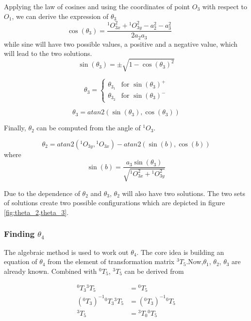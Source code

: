 \documentclass{article}
\renewcommand{\c}[1]{\cos(\theta_{#1})}
\newcommand{\s}[1]{\sin(\theta_{#1})}
\newcommand{\T}[2]{{}^{#1}T_{#2}}
\renewcommand{\O}[2]{{}^{#1}O_{#2}}
\begin{document}
Applying the law of cosines and using the coordinates of point $O_3$ with respect to $O_1$, we can derive the expression of $\theta_3$
\begin{equation*}
\c{3} = \frac{\O{1}{3x}^2 + \O{1}{3y}^2 - a_2^2 - a_3^2}{2a_2a_3}\qquad
\end{equation*}
while sine will have two possible values, a positive and a negative value, which will lead to the two solutions.
\begin{equation*}
\s{3} = \pm\sqrt{1-\c{3}^2}
\end{equation*}

\begin{equation*}
\theta_{3} = \begin{cases} 
   \theta_{3_1} & \text{for } {\s{3}}^+ \\
   \theta_{3_2} & \text{for } {\s{3}}^-
  \end{cases}
\end{equation*}

\begin{equation}
\theta_{3} = atan2(\s{3},\c{3})
\end{equation}

Finally, $\theta_2$ can be computed from the angle of $\O{1}{3}$.

\begin{equation}
\theta_{2} = atan2(\O{1}{3y},\O{1}{3x})-atan2(\sin(b),\cos(b) )
\end{equation}
where
\begin{equation*}
\sin(b)= \frac{a_3\s{3}}{\sqrt{\O{1}{3x}^2+\O{1}{3y}^2}}
\end{equation*}

Due to the dependence of $\theta_2$ and $\theta_3$,  $\theta_2$ will also have two solutions. The two sets of solutions create two possible configurations which are depicted in figure \ref{fig:theta_2,theta_3}.

\subsubsection{Finding $\theta_4$}
The algebraic method is used to work out $\theta_4$. The core idea is building an equation of $\theta_4$ from the element of transformation matrix $\T{3}{5}$.Now,$\theta_1$, $\theta_2$, $\theta_3$ are already known. Combined with  $\T{0}{5}$,  $\T{3}{5}$ can be derived from

\begin{align}
\label{eq:inverse.t_35}
\T{0}{3}\T{3}{5} & = \T{0}{5} \nonumber \\
{(\T{0}{3})}^{-1}\T{0}{3}\T{3}{5}& = {(\T{0}{3})}^{-1} \T{0}{5} \nonumber \\
\T{3}{5} & = \T{3}{0} \T{0}{5}
\end{align}
\end{document}
